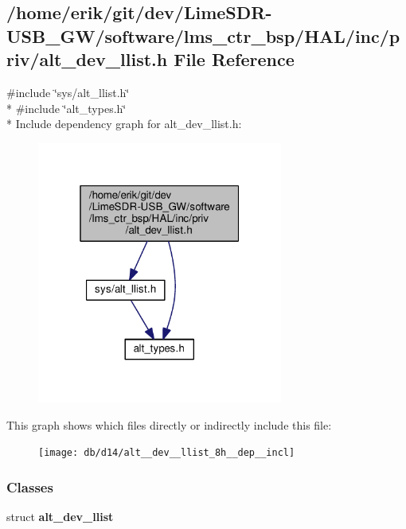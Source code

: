 \subsection{/home/erik/git/dev/\+Lime\+S\+D\+R-\/\+U\+S\+B\+\_\+\+G\+W/software/lms\+\_\+ctr\+\_\+bsp/\+H\+A\+L/inc/priv/alt\+\_\+dev\+\_\+llist.h File Reference}
\label{alt__dev__llist_8h}
{\ttfamily \#include \char`\"{}sys/alt\+\_\+llist.\+h\char`\"{}}\\*
{\ttfamily \#include \char`\"{}alt\+\_\+types.\+h\char`\"{}}\\*
Include dependency graph for alt\+\_\+dev\+\_\+llist.\+h\+:
\nopagebreak
\begin{figure}[H]
\begin{center}
\leavevmode
\includegraphics[width=229pt]{dc/d0f/alt__dev__llist_8h__incl}
\end{center}
\end{figure}
This graph shows which files directly or indirectly include this file\+:
\nopagebreak
\begin{figure}[H]
\begin{center}
\leavevmode
\texttt{[image: db/d14/alt\_\_dev\_\_llist\_8h\_\_dep\_\_incl]}
\end{center}
\end{figure}
\subsubsection*{Classes}
\begin{DoxyCompactItemize}
\item 
struct {\bf alt\+\_\+dev\+\_\+llist}
\end{DoxyCompactItemize}
